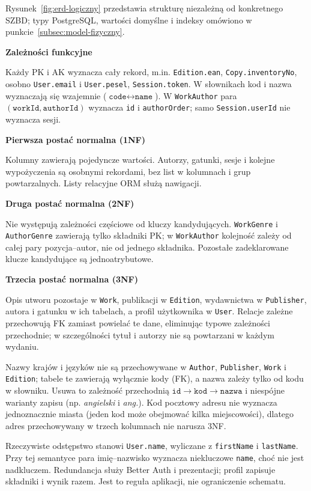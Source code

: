 \documentclass[11pt, a4paper]{article}
\begin{document}
Rysunek~\ref{fig:erd-logiczny} przedstawia strukturę niezależną od konkretnego SZBD; typy PostgreSQL, wartości domyślne i indeksy omówiono w punkcie~\ref{subsec:model-fizyczny}.

\noindent\textbf{Zależności funkcyjne}

Każdy PK i AK wyznacza cały rekord, m.in. \texttt{Edition.ean}, \texttt{Copy.inventoryNo}, osobno \texttt{User.email} i \texttt{User.pesel}, \texttt{Session.token}. W słownikach kod i nazwa wyznaczają się wzajemnie ($\texttt{code} \leftrightarrow \texttt{name}$). W \texttt{WorkAuthor} para $(\texttt{workId},\texttt{authorId})$ wyznacza \texttt{id} i \texttt{authorOrder}; samo \texttt{Session.userId} nie wyznacza sesji.

\noindent\textbf{Pierwsza postać normalna (1NF)}

Kolumny zawierają pojedyncze wartości. Autorzy, gatunki, sesje i kolejne wypożyczenia są osobnymi rekordami, bez list w kolumnach i grup powtarzalnych. Listy relacyjne ORM służą nawigacji.

\noindent\textbf{Druga postać normalna (2NF)}

Nie występują zależności częściowe od kluczy kandydujących. \texttt{WorkGenre} i \texttt{AuthorGenre} zawierają tylko składniki PK; w \texttt{WorkAuthor} kolejność zależy od całej pary pozycja--autor, nie od jednego składnika. Pozostałe zadeklarowane klucze kandydujące są jednoatrybutowe.

\noindent\textbf{Trzecia postać normalna (3NF)}

Opis utworu pozostaje w \texttt{Work}, publikacji w \texttt{Edition}, wydawnictwa w \texttt{Publisher}, autora i gatunku w ich tabelach, a profil użytkownika w \texttt{User}. Relacje zależne przechowują FK zamiast powielać te dane, eliminując typowe zależności przechodnie; w szczególności tytuł i autorzy nie są powtarzani w każdym wydaniu.

Nazwy krajów i języków nie są przechowywane w \texttt{Author}, \texttt{Publisher}, \texttt{Work} i \texttt{Edition}; tabele te zawierają wyłącznie kody (FK), a nazwa zależy tylko od kodu w słowniku. Usuwa to zależność przechodnią $\texttt{id} \to \texttt{kod} \to \texttt{nazwa}$ i niespójne warianty zapisu (np. \emph{angielski} i \emph{ang.}). Kod pocztowy adresu nie wyznacza jednoznacznie miasta (jeden kod może obejmować kilka miejscowości), dlatego adres przechowywany w trzech kolumnach nie narusza 3NF.


Rzeczywiste odstępstwo stanowi \texttt{User.name}, wyliczane z \texttt{firstName} i \texttt{lastName}. Przy tej semantyce para imię--nazwisko wyznacza niekluczowe \texttt{name}, choć nie jest nadkluczem. Redundancja służy Better Auth i prezentacji; profil zapisuje składniki i wynik razem. Jest to reguła aplikacji, nie ograniczenie schematu.
\end{document}
